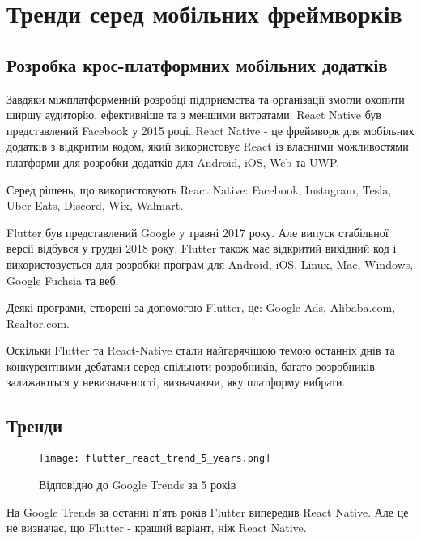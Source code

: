 \newpage

\renewcommand{\proofname}{Доведення}
\renewcommand{\chaptername}{РОЗДІЛ}
\chapter{Тренди серед мобільних фреймворків}
\label{ch1}

\section{Розробка крос-платформних мобільних додатків}
\label{section.1.1}
Завдяки міжплатформенній розробці підприємства та організації змогли охопити ширшу аудиторію, ефективніше та з меншими витратами.
React Native був представлений Facebook у 2015 році.
React Native - це фреймворк для мобільних додатків з відкритим кодом, який використовує React із власними можливостями платформи для розробки додатків для Android, iOS, Web та UWP.

Серед рішень, що використовують React Native: Facebook, Instagram, Tesla, Uber Eats, Discord, Wix, Walmart.

Flutter був представлений Google у травні 2017 року. Але випуск стабільної версії відбувся у грудні 2018 року.
Flutter також має відкритий вихідний код і використовується для розробки програм для Android, iOS, Linux, Mac, Windows, Google Fuchsia та веб.

Деякі програми, створені за допомогою Flutter, це: Google Ads, Alibaba.com, Realtor.com.

Оскільки Flutter та React-Native стали найгарячішою темою останніх днів та конкурентними дебатами серед спільноти розробників, багато розробників залижаються у невизначеності, визначаючи, яку платформу вибрати.

\section{Тренди}\label{section.1.2}

\begin{figure}
    \label{fig:flutter_react_trend_5_years}
    \texttt{[image: flutter\_react\_trend\_5\_years.png]}

    Відповідно до Google Trends за 5 років
\end{figure}

На Google Trends за останні п’ять років Flutter випередив React Native.
Але це не визначає, що Flutter - кращий варіант, ніж React Native.

